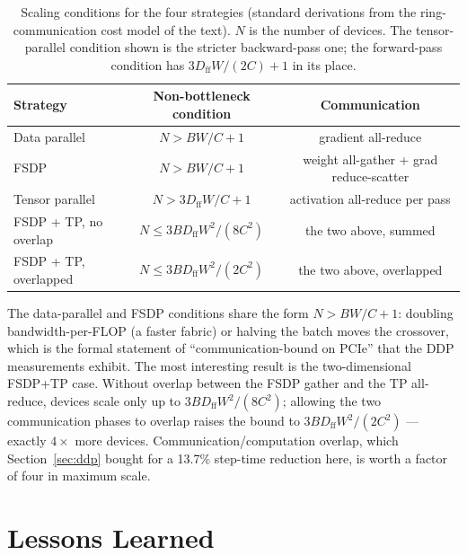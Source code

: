 \documentclass{article}
\begin{document}
\begin{table}[t]
  \caption{Scaling conditions for the four strategies (standard derivations from the ring-communication cost model of the text). $N$ is the number of devices. The tensor-parallel condition shown is the stricter backward-pass one; the forward-pass condition has $3D_{\text{ff}}W/(2C)+1$ in its place.}
  \label{tab:scaling}
  \centering
  \small
  \begin{tabular}{@{}lcc@{}}
    \toprule
    Strategy & Non-bottleneck condition & Communication \\
    \midrule
    Data parallel & $N > BW/C + 1$ & gradient all-reduce \\
    FSDP & $N > BW/C + 1$ & weight all-gather + grad reduce-scatter \\
    Tensor parallel & $N > 3D_{\text{ff}}W/C + 1$ & activation all-reduce per pass \\
    FSDP + TP, no overlap & $N \le 3BD_{\text{ff}}W^2/(8C^2)$ & the two above, summed \\
    FSDP + TP, overlapped & $N \le 3BD_{\text{ff}}W^2/(2C^2)$ & the two above, overlapped \\
    \bottomrule
  \end{tabular}
\end{table}

The data-parallel and FSDP conditions share the form $N > BW/C + 1$: doubling bandwidth-per-FLOP (a faster fabric) or halving the batch moves the crossover, which is the formal statement of ``communication-bound on PCIe'' that the DDP measurements exhibit. The most interesting result is the two-dimensional FSDP+TP case. Without overlap between the FSDP gather and the TP all-reduce, devices scale only up to $3BD_{\text{ff}}W^2/(8C^2)$; allowing the two communication phases to overlap raises the bound to $3BD_{\text{ff}}W^2/(2C^2)$ --- exactly $4\times$ more devices. Communication/computation overlap, which Section~\ref{sec:ddp} bought for a 13.7\% step-time reduction here, is worth a factor of four in maximum scale.

\section{Lessons Learned}
\end{document}
